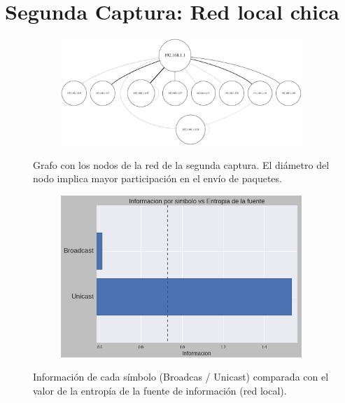 \section{Segunda Captura: Red local chica}

\begin{figure}[h]
  \hspace*{-0.5cm}
  \begin{subfigure}{1.1\textwidth}
    \includegraphics[width=\textwidth]{imagenes/hogarenia/grafo.png}
  \end{subfigure}
	\label{fig:expw_hogar_grafo}
	\caption{Grafo con los nodos de la red de la segunda captura. El diámetro del nodo implica mayor participación en el envío de paquetes.}
\end{figure}

\begin{figure}[h]
  \begin{subfigure}{.5\textwidth}
    \includegraphics[width=\textwidth]{imagenes/hogarenia/brvsun_informaciones_vs_entropia.png}
  \end{subfigure}
  \label{fig:exp2_hogar_brvsun_infovsentro}
  \caption{Información de cada símbolo (Broadcas / Unicast) comparada con el valor de la entropía de la fuente de información (red local).}
\end{figure}

